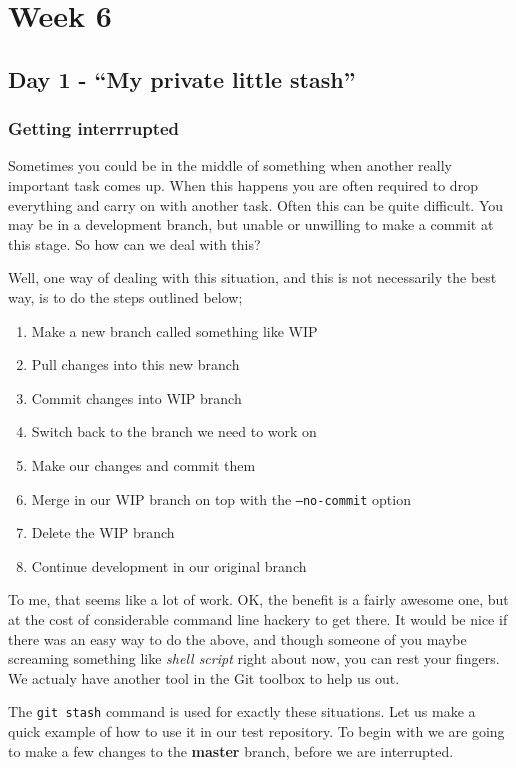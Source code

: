 \cleardoublepage
\chapter{Week 6}

\section{Day 1 - ``My private little stash''}
\subsection{Getting interrrupted}

Sometimes you could be in the middle of something when another really important task comes up.  When this happens you are often required to drop everything and carry on with another task.  Often this can be quite difficult.  You may be in a development branch, but unable or unwilling to make a commit at this stage.  So how can we deal with this?

Well, one way of dealing with this situation, and this is not necessarily the best way, is to do the steps outlined below;

\begin{enumerate}
\item Make a new branch called something like WIP
\item Pull changes into this new branch
\item Commit changes into WIP branch
\item Switch back to the branch we need to work on
\item Make our changes and commit them
\item Merge in our WIP branch on top with the \texttt{--no-commit} option
\item Delete the WIP branch
\item Continue development in our original branch
\end{enumerate}

To me, that seems like a lot of work.  OK, the benefit is a fairly awesome one, but at the cost of considerable command line hackery to get there.  It would be nice if there was an easy way to do the above, and though someone of you maybe screaming something like \emph{shell script} right about now, you can rest your fingers.  We actualy have another tool in the Git toolbox to help us out.

The \texttt{git stash} command is used for exactly these situations.  Let us make a quick example of how to use it in our test repository.  To begin with we are going to make a few changes to the \textbf{master} branch, before we are interrupted.

